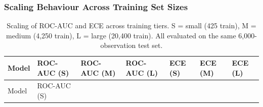 \documentclass[
  letterpaper,
  DIV=11,
  numbers=noendperiod]{scrartcl}
\begin{document}
\subsubsection{Scaling Behaviour Across Training Set
Sizes}\label{sec-fm-scaling}

\begin{longtable}[]{@{}
  >{\raggedright\arraybackslash}p{}
  >{\centering\arraybackslash}p{}
  >{\centering\arraybackslash}p{}
  >{\centering\arraybackslash}p{}
  >{\centering\arraybackslash}p{}
  >{\centering\arraybackslash}p{}
  >{\centering\arraybackslash}p{}@{}}
\caption{Scaling of ROC-AUC and ECE across training tiers. S = small
(425 train), M = medium (4,250 train), L = large (20,400 train). All
evaluated on the same 6,000-observation test
set.}\label{tbl-fm-scaling}\tabularnewline
\toprule\noalign{}
\begin{minipage}[b]{\linewidth}\raggedright
Model
\end{minipage} & \begin{minipage}[b]{\linewidth}\centering
ROC-AUC (S)
\end{minipage} & \begin{minipage}[b]{\linewidth}\centering
ROC-AUC (M)
\end{minipage} & \begin{minipage}[b]{\linewidth}\centering
ROC-AUC (L)
\end{minipage} & \begin{minipage}[b]{\linewidth}\centering
ECE (S)
\end{minipage} & \begin{minipage}[b]{\linewidth}\centering
ECE (M)
\end{minipage} & \begin{minipage}[b]{\linewidth}\centering
ECE (L)
\end{minipage} \\
\midrule\noalign{}
\endfirsthead
\toprule\noalign{}
\begin{minipage}[b]{\linewidth}\raggedright
Model
\end{minipage} & \begin{minipage}[b]{\linewidth}\centering
ROC-AUC (S)
\end{minipage} & \begin{minipage}[b]{\linewidth}\centering

\end{minipage}
\end{longtable}
\end{document}
